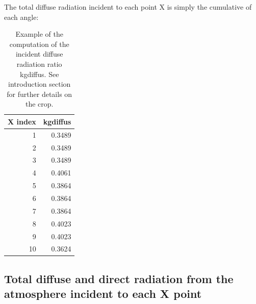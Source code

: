 \documentclass[
]{book}
\newenvironment{Shaded}{\begin{snugshade}}{\end{snugshade}}
\newcommand{\DataTypeTok}[1]{\textcolor[rgb]{0.13,0.29,0.53}{#1}}
\newcommand{\KeywordTok}[1]{\textcolor[rgb]{0.13,0.29,0.53}{\textbf{#1}}}
\newcommand{\NormalTok}[1]{#1}
\newcommand{\OperatorTok}[1]{\textcolor[rgb]{0.81,0.36,0.00}{\textbf{#1}}}
\newcommand{\StringTok}[1]{\textcolor[rgb]{0.31,0.60,0.02}{#1}}
\begin{document}
The total diffuse radiation incident to each point X is simply the cumulative of each angle:

\begin{Shaded}
\end{Shaded}

\begin{table}

\caption{\label{tab:kdifftot}Example of the computation of the incident diffuse radiation ratio kgdiffus. See introduction section for further details on the crop.}
\centering
\begin{tabular}[t]{r|r}
\hline
X index & kgdiffus\\
\hline
1 & 0.3489\\
\hline
2 & 0.3489\\
\hline
3 & 0.3489\\
\hline
4 & 0.4061\\
\hline
5 & 0.3864\\
\hline
6 & 0.3864\\
\hline
7 & 0.3864\\
\hline
8 & 0.4023\\
\hline
9 & 0.4023\\
\hline
10 & 0.3624\\
\hline
\end{tabular}
\end{table}

\hypertarget{total-diffuse-and-direct-radiation-from-the-atmosphere-incident-to-each-x-point}{%
\subsection{Total diffuse and direct radiation from the atmosphere incident to each X point}\label{total-diffuse-and-direct-radiation-from-the-atmosphere-incident-to-each-x-point}}
\end{document}
